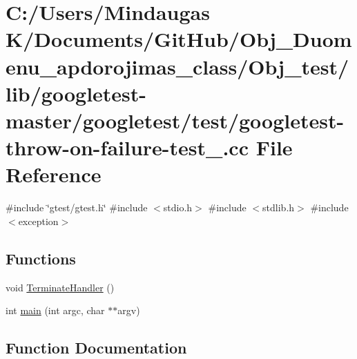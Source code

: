 \hypertarget{_obj__test_2lib_2googletest-master_2googletest_2test_2googletest-throw-on-failure-test___8cc}{}\section{C\+:/\+Users/\+Mindaugas K/\+Documents/\+Git\+Hub/\+Obj\+\_\+\+Duomenu\+\_\+apdorojimas\+\_\+class/\+Obj\+\_\+test/lib/googletest-\/master/googletest/test/googletest-\/throw-\/on-\/failure-\/test\+\_\+.cc File Reference}
\label{_obj__test_2lib_2googletest-master_2googletest_2test_2googletest-throw-on-failure-test___8cc}
{\ttfamily \#include \char`\"{}gtest/gtest.\+h\char`\"{}}\newline
{\ttfamily \#include $<$stdio.\+h$>$}\newline
{\ttfamily \#include $<$stdlib.\+h$>$}\newline
{\ttfamily \#include $<$exception$>$}\newline
\subsection*{Functions}
\begin{DoxyCompactItemize}
\item 
void \mbox{\hyperlink{_obj__test_2lib_2googletest-master_2googletest_2test_2googletest-throw-on-failure-test___8cc_a478ad0386ef3cac98d230812ed07eeda}{Terminate\+Handler}} ()
\item 
int \mbox{\hyperlink{_obj__test_2lib_2googletest-master_2googletest_2test_2googletest-throw-on-failure-test___8cc_a3c04138a5bfe5d72780bb7e82a18e627}{main}} (int argc, char $\ast$$\ast$argv)
\end{DoxyCompactItemize}


\subsection{Function Documentation}
\mbox{\label{_obj__test_2lib_2googletest-master_2googletest_2test_2googletest-throw-on-failure-test___8cc_a3c04138a5bfe5d72780bb7e82a18e627}} 
